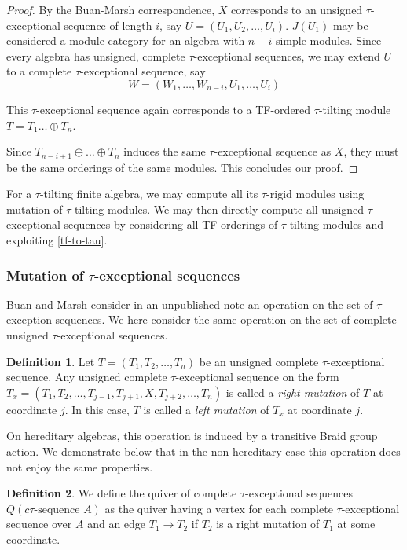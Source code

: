 \documentclass[]{article}
\theoremstyle{definition}
\newtheorem{definition}{Definition}[section]
\newcommand{\tu}{\ensuremath{\tau}}
\begin{document}
\begin{proof}
	By the Buan-Marsh correspondence, $X$ corresponds to an unsigned \tu-exceptional sequence of length $i$, say $U = (U_1,U_2,\dots,U_i)$. $J(U_1)$ may be considered a module category for an algebra with $n - i$ simple modules. Since every algebra has unsigned, complete \tu-exceptional sequences, we may extend $U$ to a complete $\tu$-exceptional sequence, say \[W = (W_1, \dots,  W_{n-i},  U_1, \dots, U_i)\] 
	
	This \tu-exceptional sequence again corresponds to a TF-ordered \tu-tilting module $T = T_1 \dots \oplus T_n$.
	
	Since $T_{n-i+1} \oplus \dots \oplus T_{n}$ induces the same \tu-exceptional sequence as $X$, they must be the same orderings of the same modules. This concludes our proof.
	
\end{proof}



For a $\tau$-tilting finite algebra, we may compute all its \tu-rigid modules using mutation of \tu-tilting modules. We may then directly compute all unsigned \tu-exceptional sequences by considering all TF-orderings of \tu-tilting modules and exploiting \cref{tf-to-tau}.

\subsubsection{Mutation of \tu-exceptional sequences}
Buan and Marsh consider in an unpublished note an operation on the set of \tu-exception sequences. We here consider the same operation on the set of complete unsigned \tu-exceptional sequences.

\begin{definition}
	Let $ T = (T_1,T_2,\dots,T_n)$ be an unsigned complete \tu-exceptional sequence. Any unsigned complete \tu-exceptional sequence on the form $T_x = (T_1,T_2,\dots,T_{j-1},T_{j+1},X,T_{j+2},\dots,T_n)$ is called a \textit{right mutation} of $T$ at coordinate $j$. In this case, $T$ is called a  \textit{left mutation} of $T_x$ at coordinate $j$.
\end{definition}

On hereditary algebras, this operation is induced by a transitive Braid group action. We demonstrate below that in the non-hereditary case this operation does not enjoy the same properties.

\begin{definition}
	We define the quiver of complete \tu-exceptional sequences $Q(c\tu \text{-sequence } A)$ as the quiver having a vertex for each complete \tu-exceptional sequence over $A$ and an edge $T_1 \to T_2$ if $T_2$ is a right mutation of $T_1$ at some coordinate.
\end{definition}
\end{document}
